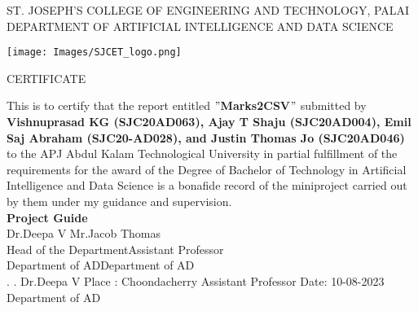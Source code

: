 \thispagestyle{empty}
\begin{center}
\normalsize{ST. JOSEPH’S COLLEGE OF ENGINEERING AND TECHNOLOGY, PALAI}\\[0.5cm]
\normalsize
 { DEPARTMENT OF ARTIFICIAL INTELLIGENCE AND DATA SCIENCE}\\[1.0cm]%
   \begin{center}
   \texttt{[image: Images/SJCET\_logo.png]}
   \end{center}
{\large CERTIFICATE}\\[1.5cm]
\end{center}
\normalsize 
This is to certify that the report entitled {\bf $"$Marks2CSV$"$} submitted by { \bf Vishnuprasad KG (SJC20AD063), Ajay T Shaju (SJC20AD004), Emil Saj Abraham (SJC20-AD028), and Justin Thomas Jo (\mbox{SJC20AD046})} to the APJ Abdul Kalam Technological University in partial fulfillment of the requirements for the award of the Degree of Bachelor of Technology in Artificial Intelligence and Data Science is a bonafide record of the miniproject carried out by them under my guidance and supervision.\vspace{1.3 cm}\\
{\bf Project Guide}\hspace{8.35 cm}{\bf Project Coordinator}\\
Dr.Deepa V\hspace{9.0 cm} Mr.Jacob Thomas\\
Head of the Department\hspace{6.85 cm}Assistant Professor\hspace{2.6 cm}\\Department of AD\hspace{7.9 cm}Department of AD
\vspace{1.3 cm}\\
.\hspace{11.06 cm}{\bf Head of the Department}
\newline
.\hspace{11.01 cm} Dr.Deepa V
\newline
Place : Choondacherry  \hspace{6.87 cm} Assistant Professor
\newline
Date\hspace{0.25 cm}: 10-08-2023 \hspace{7.7 cm} Department of AD      


